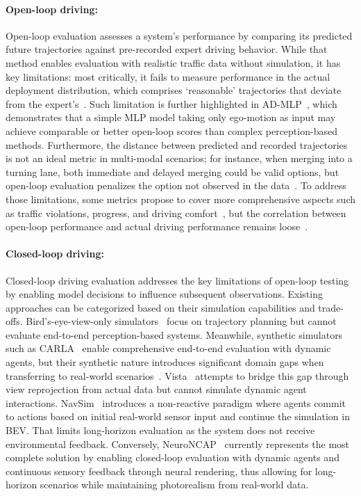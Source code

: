 \paragraph{Open-loop driving:} Open-loop evaluation assesses a system's performance by comparing its predicted future trajectories against pre-recorded expert driving behavior. While that method enables evaluation with realistic traffic data without simulation, it has key limitations: most critically, it fails to measure performance in the actual deployment distribution, which comprises `reasonable' trajectories that deviate from the expert's~\cite{codevilla2018offlineEval, dauner2023parting}. Such limitation is further highlighted in AD-MLP~\cite{zhai2023ADMLP}, which demonstrates that a simple MLP model taking only ego-motion as input may achieve comparable or better open-loop scores than complex perception-based methods.
Furthermore, the distance between predicted and recorded trajectories is not an ideal metric in multi-modal scenarios; for instance, when merging into a turning lane, both immediate and delayed merging could be valid options, but open-loop evaluation penalizes the option not observed in the data~\cite{zhai2023ADMLP}.
To address those limitations, some metrics propose to cover more comprehensive aspects such as traffic violations, progress, and driving comfort~\cite{dauner2023parting}, but the correlation between open-loop performance and actual driving performance remains loose~\cite{dauner2023parting}. 

%
\paragraph{Closed-loop driving:} Closed-loop driving evaluation addresses the key limitations of open-loop testing by enabling model decisions to influence subsequent observations. Existing approaches can be categorized based on their simulation capabilities and trade-offs. Bird's-eye-view-only simulators~\cite{Gulino2023waymax, caesar2021nuplan} focus on trajectory planning but cannot evaluate end-to-end perception-based systems. Meanwhile, synthetic simulators such as CARLA~\cite{dosovitskiy2017carla} enable comprehensive end-to-end evaluation with dynamic agents, but their synthetic nature introduces significant domain gaps when transferring to real-world scenarios~\cite{chen2023e2esurvey}. Vista~\cite{amini2020vista,amini2022vista2} attempts to bridge this gap through view reprojection from actual data but cannot simulate dynamic agent interactions. NavSim~\cite{Dauner2024navsim} introduces a non-reactive paradigm where agents commit to actions based on initial real-world sensor input and continue the simulation in BEV. That limits long-horizon evaluation as the system does not receive environmental feedback.
Conversely, NeuroNCAP~\cite{ljungbergh2024neuroncap} currently represents the most complete solution by enabling closed-loop evaluation with dynamic agents and continuous sensory feedback through neural rendering, thus allowing for long-horizon scenarios while maintaining photorealism from real-world data.
